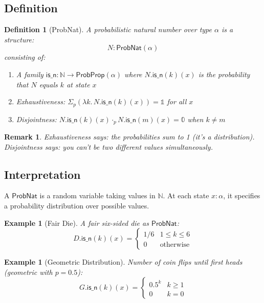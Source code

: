 \documentclass[11pt,a4paper]{article}
\newtheorem{definition}[theorem]{Definition}
\newtheorem{remark}[theorem]{Remark}
\newtheorem{example}[theorem]{Example}
\newcommand{\ProbProp}{\mathsf{ProbProp}}
\newcommand{\ProbNat}{\mathsf{ProbNat}}
\newcommand{\pzero}{\mathbb{0}}
\newcommand{\pone}{\mathbb{1}}
\newcommand{\pmul}{\cdot_p}
\newcommand{\psum}{\Sigma_p}
\newcommand{\Nat}{\mathbb{N}}
\begin{document}
\subsection{Definition}

\begin{definition}[ProbNat]
A \emph{probabilistic natural number} over type $\alpha$ is a structure:
\[
N : \ProbNat(\alpha)
\]
consisting of:
\begin{enumerate}
    \item A family $\mathsf{is\_n} : \Nat \to \ProbProp(\alpha)$ where $N.\mathsf{is\_n}(k)(x)$ is the probability that $N$ equals $k$ at state $x$
    \item Exhaustiveness: $\psum(\lambda k.\, N.\mathsf{is\_n}(k)(x)) = \pone$ for all $x$
    \item Disjointness: $N.\mathsf{is\_n}(k)(x) \pmul N.\mathsf{is\_n}(m)(x) = \pzero$ when $k \neq m$
\end{enumerate}
\end{definition}

\begin{remark}
Exhaustiveness says: the probabilities sum to 1 (it's a distribution).
Disjointness says: you can't be two different values simultaneously.
\end{remark}

\subsection{Interpretation}

A $\ProbNat$ is a random variable taking values in $\Nat$. At each state $x : \alpha$, it specifies a probability distribution over possible values.

\begin{example}[Fair Die]
A fair six-sided die as $\ProbNat$:
\[
D.\mathsf{is\_n}(k)(x) = \begin{cases} 1/6 & 1 \leq k \leq 6 \\ 0 & \text{otherwise} \end{cases}
\]
\end{example}

\begin{example}[Geometric Distribution]
Number of coin flips until first heads (geometric with $p = 0.5$):
\[
G.\mathsf{is\_n}(k)(x) = \begin{cases} 0.5^k & k \geq 1 \\ 0 & k = 0 \end{cases}
\]
\end{example}
\end{document}
